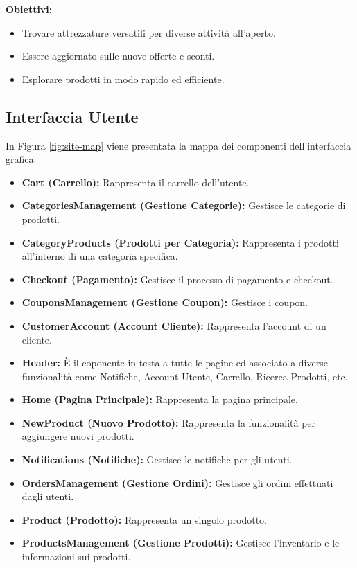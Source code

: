 \textbf{Obiettivi:}
\begin{itemize}
    \item Trovare attrezzature versatili per diverse attività all'aperto.
    \item Essere aggiornato sulle nuove offerte e sconti.
    \item Esplorare prodotti in modo rapido ed efficiente.
\end{itemize}

\subsection{Interfaccia Utente}

In Figura \ref{fig:site-map} viene presentata la mappa dei componenti dell'interfaccia grafica:

\begin{itemize}
    \item \textbf{Cart (Carrello):} Rappresenta il carrello dell'utente.
    \item \textbf{CategoriesManagement (Gestione Categorie):} Gestisce le categorie di prodotti.
    \item \textbf{CategoryProducts (Prodotti per Categoria):} Rappresenta i prodotti all'interno di una categoria specifica.
    \item \textbf{Checkout (Pagamento):} Gestisce il processo di pagamento e checkout.
    \item \textbf{CouponsManagement (Gestione Coupon):} Gestisce i coupon.
    \item \textbf{CustomerAccount (Account Cliente):} Rappresenta l'account di un cliente.
    \item \textbf{Header:} È il coponente in testa a tutte le pagine ed associato a diverse funzionalità come Notifiche, Account Utente, Carrello, Ricerca Prodotti, etc.
    \item \textbf{Home (Pagina Principale):} Rappresenta la pagina principale.
    \item \textbf{NewProduct (Nuovo Prodotto):} Rappresenta la funzionalità per aggiungere nuovi prodotti.
    \item \textbf{Notifications (Notifiche):} Gestisce le notifiche per gli utenti.
    \item \textbf{OrdersManagement (Gestione Ordini):} Gestisce gli ordini effettuati dagli utenti.
    \item \textbf{Product (Prodotto):} Rappresenta un singolo prodotto.
    \item \textbf{ProductsManagement (Gestione Prodotti):} Gestisce l'inventario e le informazioni sui prodotti.

\end{itemize}
